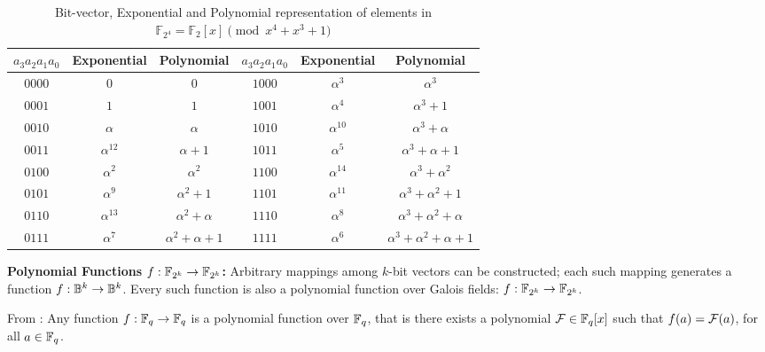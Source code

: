\begin{Example}
\vspace{-0.1in}
\begin{table}[h]
\begin{center}
{\tiny
\caption{Bit-vector, Exponential and Polynomial representation of
elements in  ${\mathbb{F}}_{2^4} = {\mathbb{F}}_2[x]
\pmod{x^4+x^3+1}$}\label{tab:gfelement}  
\begin{tabular}{|c|c|c||c|c|c|} 
\hline
$a_3a_2a_1a_0$ & Exponential & Polynomial     &$a_3a_2a_1a_0$ & Exponential & Polynomial  \\
\hline
$0000$        & $0$         & $0$            & $1000$ & $\alpha^3$ &  $\alpha^3$\\
\hline
$0001$        & $1$         & $1$            & $1001$ & $\alpha^4$ & $\alpha^3 + 1$\\
\hline
$0010$        & $\alpha$    & $\alpha$       & $1010$ & $\alpha^{10}$&$\alpha^3 + \alpha$  \\
\hline
$0011$        & $\alpha^{12}$& $\alpha + 1$   & $1011$ & $\alpha^5$ & $\alpha^3+\alpha+1$\\
\hline
$0100$        & $\alpha^2$  & $\alpha^2$     &  $1100$ & $\alpha^{14}$ & $\alpha^3 + \alpha^2$\\
\hline
$0101$        & $\alpha^9$   &$\alpha^2 + 1$ & $1101$  &$\alpha^{11}$  & $\alpha^3+\alpha^2+1$\\
\hline
$0110$        & $\alpha^{13}$& $\alpha^2 + \alpha$ & $1110$ & $\alpha^8$& $\alpha^3+\alpha^2+\alpha$\\
\hline
$0111$        &$\alpha^7 $ & $\alpha^2+\alpha+1$ & $1111$ &$\alpha^6$ & $\alpha^3+\alpha^2+\alpha+1$\\
\hline
\end{tabular}
}
\end{center}
\end{table}
\end{Example}




{\bf Polynomial Functions $f: {\mathbb{F}}_{2^k} \rightarrow {\mathbb{F}}_{2^k}$:} 
Arbitrary mappings among $k$-bit vectors can be constructed; each such
mapping generates a function $f: {\mathbb{B}}^k \rightarrow {\mathbb{B}}^k$. 
Every such function is also a polynomial function over Galois fields:
$f: {\mathbb{F}}_{2^k} \rightarrow {\mathbb{F}}_{2^k}$.  

\begin{Theorem}
From \cite{ff:1997}: 
Any  function $f: {\mathbb{F}}_{q} \to {\mathbb{F}}_{q}$ is a polynomial function
over ${\mathbb{F}}_{q}$, that is there exists a polynomial ${\mathcal{F}} \in {\mathbb{F}}_{q} [x]$ such
  that $f(a) = {\mathcal{F}}(a)$, for all $a \in {\mathbb{F}}_{q}$. 
\end{Theorem}

